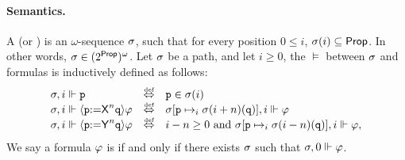 \paragraph{Semantics.} A  (or ) is an $\omega$-sequence $\sigma$, such that for every position $0\leq i$, $\sigma(i) \subseteq {\rm \sf Prop}$. In other words, $\sigma\in(2^{\rm \sf Prop})^\omega$. 
Let $\sigma$ be a path, and let $i\geq 0$, the  $\models$ between $\sigma$ and formulas is inductively defined as follows:
\[
\begin{array}{lcl}
\apath,i \models \avarprop & \iffdef & \avarprop\in\apath(i) \\
\apath,i \models \Assign{\avarprop}{\Nextn\avarpropbis}\aformula & \iffdef & \apath[\avarprop\mapsto_i \apath(i+n)(\avarpropbis)],i \models \aformula \\ 
\apath,i \models \Assign{\avarprop}{\Prevn\avarpropbis}\aformula & \iffdef & i-n \geq 0 \mbox{ and } \apath[\avarprop\mapsto_i \apath(i-n)(\avarpropbis)],i \models \aformula,
\end{array}
\]
We say a formula $\varphi$ is  if and only if there exists $\sigma$ such that $\sigma,0\Vdash\varphi$.

